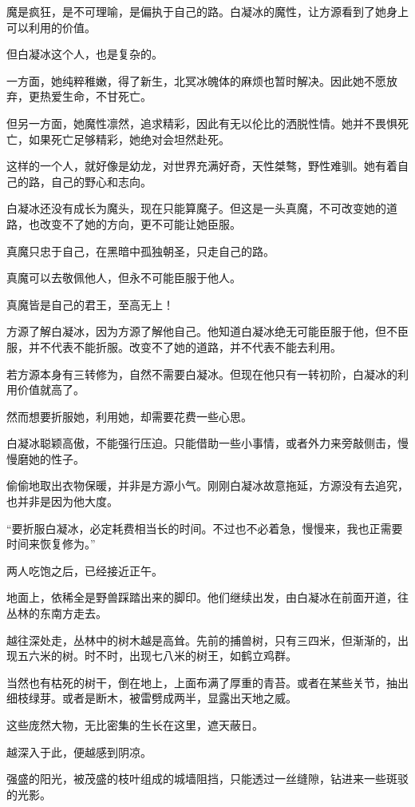 \begin{this_body}
魔是疯狂，是不可理喻，是偏执于自己的路。白凝冰的魔性，让方源看到了她身上可以利用的价值。

但白凝冰这个人，也是复杂的。

一方面，她纯粹稚嫩，得了新生，北冥冰魄体的麻烦也暂时解决。因此她不愿放弃，更热爱生命，不甘死亡。

但另一方面，她魔性凛然，追求精彩，因此有无以伦比的洒脱性情。她并不畏惧死亡，如果死亡足够精彩，她绝对会坦然赴死。

这样的一个人，就好像是幼龙，对世界充满好奇，天性桀骜，野性难驯。她有着自己的路，自己的野心和志向。

白凝冰还没有成长为魔头，现在只能算魔子。但这是一头真魔，不可改变她的道路，也改变不了她的方向，更不可能让她臣服。

真魔只忠于自己，在黑暗中孤独朝圣，只走自己的路。

真魔可以去敬佩他人，但永不可能臣服于他人。

真魔皆是自己的君王，至高无上！

方源了解白凝冰，因为方源了解他自己。他知道白凝冰绝无可能臣服于他，但不臣服，并不代表不能折服。改变不了她的道路，并不代表不能去利用。

若方源本身有三转修为，自然不需要白凝冰。但现在他只有一转初阶，白凝冰的利用价值就高了。

然而想要折服她，利用她，却需要花费一些心思。

白凝冰聪颖高傲，不能强行压迫。只能借助一些小事情，或者外力来旁敲侧击，慢慢磨她的性子。

偷偷地取出衣物保暖，并非是方源小气。刚刚白凝冰故意拖延，方源没有去追究，也并非是因为他大度。

“要折服白凝冰，必定耗费相当长的时间。不过也不必着急，慢慢来，我也正需要时间来恢复修为。”

两人吃饱之后，已经接近正午。

地面上，依稀全是野兽踩踏出来的脚印。他们继续出发，由白凝冰在前面开道，往丛林的东南方走去。

越往深处走，丛林中的树木越是高耸。先前的捕兽树，只有三四米，但渐渐的，出现五六米的树。时不时，出现七八米的树王，如鹤立鸡群。

当然也有枯死的树干，倒在地上，上面布满了厚重的青苔。或者在某些关节，抽出细枝绿芽。或者是断木，被雷劈成两半，显露出天地之威。

这些庞然大物，无比密集的生长在这里，遮天蔽日。

越深入于此，便越感到阴凉。

强盛的阳光，被茂盛的枝叶组成的城墙阻挡，只能透过一丝缝隙，钻进来一些斑驳的光影。


\end{this_body}
